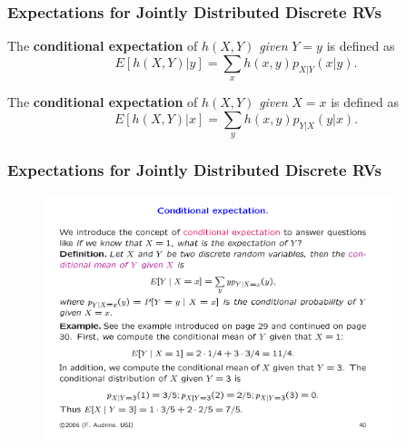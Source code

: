 \documentclass[notes=show,handout]{beamer}\usepackage[]{graphicx}\usepackage[]{color}
\begin{document}
\begin{frame}%

\frametitle{Expectations for Jointly Distributed Discrete RVs}

\begin{definition}
The \textbf{conditional expectation }of $h\left( X,Y\right) $
\emph{given} $Y=y$ is defined as%
\begin{equation*}
E\left[ h\left( X,Y\right) |y\right] =\sum_{x}h\left( x,y\right)
p_{X|Y}\left( x|y\right).
\end{equation*}

The \textbf{conditional expectation }of $h\left( X,Y\right) $
\emph{given} $X=x$ is defined as%
\begin{equation*}
E\left[ h\left( X,Y\right) |x\right] =\sum_{y}h\left( x,y\right)
p_{Y|X}\left( y|x\right).
\end{equation*}
\end{definition}

\end{frame}%



\begin{frame}
\frametitle{Expectations for Jointly Distributed Discrete RVs}
\begin{example}
\begin{figure}[ptb]\centering
\includegraphics[width=0.9\textwidth,height=0.4\textheight]{img/ex_cond_audrins.pdf}
\end{figure}
\end{example}
\end{frame}
\end{document}
